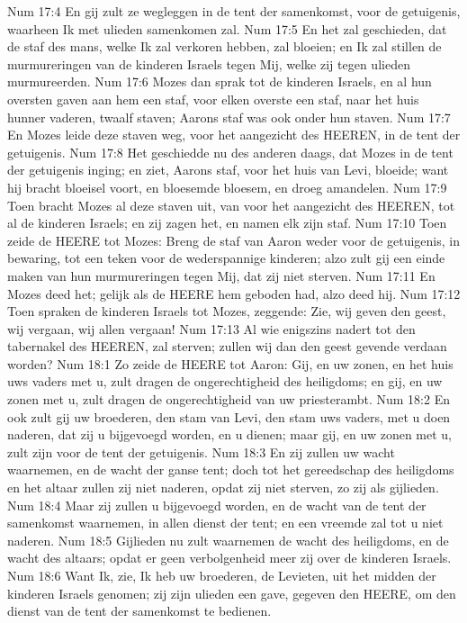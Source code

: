 Num 17:4  En gij zult ze wegleggen in de tent der samenkomst, voor de getuigenis, waarheen Ik met ulieden samenkomen zal.
Num 17:5  En het zal geschieden, dat de staf des mans, welke Ik zal verkoren hebben, zal bloeien; en Ik zal stillen de murmureringen van de kinderen Israels tegen Mij, welke zij tegen ulieden murmureerden.
Num 17:6  Mozes dan sprak tot de kinderen Israels, en al hun oversten gaven aan hem een staf, voor elken overste een staf, naar het huis hunner vaderen, twaalf staven; Aarons staf was ook onder hun staven.
Num 17:7  En Mozes leide deze staven weg, voor het aangezicht des HEEREN, in de tent der getuigenis.
Num 17:8  Het geschiedde nu des anderen daags, dat Mozes in de tent der getuigenis inging; en ziet, Aarons staf, voor het huis van Levi, bloeide; want hij bracht bloeisel voort, en bloesemde bloesem, en droeg amandelen.
Num 17:9  Toen bracht Mozes al deze staven uit, van voor het aangezicht des HEEREN, tot al de kinderen Israels; en zij zagen het, en namen elk zijn staf.
Num 17:10  Toen zeide de HEERE tot Mozes: Breng de staf van Aaron weder voor de getuigenis, in bewaring, tot een teken voor de wederspannige kinderen; alzo zult gij een einde maken van hun murmureringen tegen Mij, dat zij niet sterven.
Num 17:11  En Mozes deed het; gelijk als de HEERE hem geboden had, alzo deed hij.
Num 17:12  Toen spraken de kinderen Israels tot Mozes, zeggende: Zie, wij geven den geest, wij vergaan, wij allen vergaan!
Num 17:13  Al wie enigszins nadert tot den tabernakel des HEEREN, zal sterven; zullen wij dan den geest gevende verdaan worden?
Num 18:1  Zo zeide de HEERE tot Aaron: Gij, en uw zonen, en het huis uws vaders met u, zult dragen de ongerechtigheid des heiligdoms; en gij, en uw zonen met u, zult dragen de ongerechtigheid van uw priesterambt.
Num 18:2  En ook zult gij uw broederen, den stam van Levi, den stam uws vaders, met u doen naderen, dat zij u bijgevoegd worden, en u dienen; maar gij, en uw zonen met u, zult zijn voor de tent der getuigenis.
Num 18:3  En zij zullen uw wacht waarnemen, en de wacht der ganse tent; doch tot het gereedschap des heiligdoms en het altaar zullen zij niet naderen, opdat zij niet sterven, zo zij als gijlieden.
Num 18:4  Maar zij zullen u bijgevoegd worden, en de wacht van de tent der samenkomst waarnemen, in allen dienst der tent; en een vreemde zal tot u niet naderen.
Num 18:5  Gijlieden nu zult waarnemen de wacht des heiligdoms, en de wacht des altaars; opdat er geen verbolgenheid meer zij over de kinderen Israels.
Num 18:6  Want Ik, zie, Ik heb uw broederen, de Levieten, uit het midden der kinderen Israels genomen; zij zijn ulieden een gave, gegeven den HEERE, om den dienst van de tent der samenkomst te bedienen.
